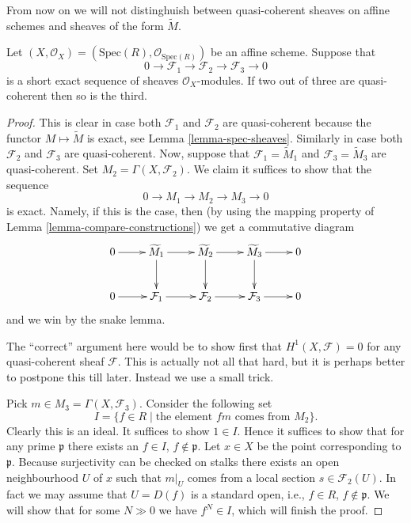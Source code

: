 \noindent
From now on we will not distinghuish between quasi-coherent
sheaves on affine schemes and sheaves of the form $\widetilde M$.

\begin{lemma}
\label{lemma-extension-quasi-coherent}
Let $(X, \mathcal{O}_X) = (\text{Spec}(R), \mathcal{O}_{\text{Spec}(R)})$
be an affine scheme. Suppose that
$$
0 \to
\mathcal{F}_1 \to
\mathcal{F}_2 \to
\mathcal{F}_3 \to
0
$$
is a short exact sequence of sheaves $\mathcal{O}_X$-modules.
If two out of three are quasi-coherent then so is the third.
\end{lemma}

\begin{proof}
This is clear in case both $\mathcal{F}_1$ and $\mathcal{F}_2$ are
quasi-coherent because the functor $M \mapsto \widetilde M$
is exact, see Lemma \ref{lemma-spec-sheaves}.
Similarly in case both $\mathcal{F}_2$ and $\mathcal{F}_3$ are
quasi-coherent. Now, suppose that $\mathcal{F}_1 = \widetilde M_1$ and 
$\mathcal{F}_3 = \widetilde M_3$ are quasi-coherent.
Set $M_2 = \Gamma(X, \mathcal{F}_2)$. We claim it suffices to show that
the sequence
$$
0 \to M_1 \to M_2 \to M_3 \to 0
$$
is exact. Namely, if this is the case, then (by using the mapping
property of Lemma \ref{lemma-compare-constructions}) we get a commutative
diagram
$$
\xymatrix{
0 \ar[r] &
\widetilde M_1 \ar[r] \ar[d] &
\widetilde M_2 \ar[r] \ar[d] &
\widetilde M_3 \ar[r] \ar[d] &
0 \\
0 \ar[r] &
\mathcal{F}_1 \ar[r] &
\mathcal{F}_2 \ar[r] &
\mathcal{F}_3 \ar[r] &
0
}
$$
and we win by the snake lemma.

\medskip\noindent
The ``correct'' argument here would be to show first
that $H^1(X, \mathcal{F}) = 0$ for any quasi-coherent sheaf $\mathcal{F}$.
This is actually not all that hard, but it is perhaps better to postpone
this till later. Instead we use a small trick.

\medskip\noindent
Pick $m \in M_3 = \Gamma(X, \mathcal{F}_3)$.
Consider the following set
$$
I = \{ f \in R \mid \text{the element }fm\text{ comes from }M_2\}.
$$
Clearly this is an ideal. It suffices to show $1 \in I$.
Hence it suffices to show that for any prime $\mathfrak p$
there exists an $f \in I$, $f \not\in \mathfrak p$.
Let $x \in X$ be the point corresponding to $\mathfrak p$.
Because surjectivity can be checked on stalks
there exists an open neighbourhood $U$ of $x$ such that
$m|_U$ comes from a local section $s \in \mathcal{F}_2(U)$.
In fact we may assume that $U = D(f)$ is a standard open,
i.e., $f \in R$, $f \not \in \mathfrak p$. We will show
that for some $N \gg 0$ we have $f^N \in I$, which
will finish the proof.


\end{proof}
